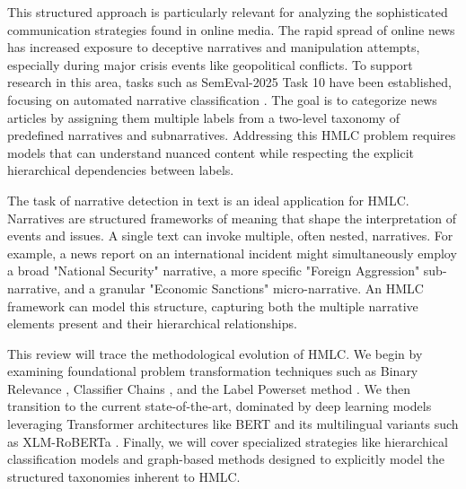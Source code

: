 This structured approach is particularly relevant for analyzing the sophisticated communication strategies found in online media. The rapid spread of online news has increased exposure to deceptive narratives and manipulation attempts, especially during major crisis events like geopolitical conflicts. To support research in this area, tasks such as SemEval-2025 Task 10 have been established, focusing on automated narrative classification \cite{semeval2025task10}. The goal is to categorize news articles by assigning them multiple labels from a two-level taxonomy of predefined narratives and subnarratives. Addressing this HMLC problem requires models that can understand nuanced content while respecting the explicit hierarchical dependencies between labels.

The task of narrative detection in text is an ideal application for HMLC. Narratives are structured frameworks of meaning that shape the interpretation of events and issues. A single text can invoke multiple, often nested, narratives. For example, a news report on an international incident might simultaneously employ a broad "National Security" narrative, a more specific "Foreign Aggression" sub-narrative, and a granular "Economic Sanctions" micro-narrative. An HMLC framework can model this structure, capturing both the multiple narrative elements present and their hierarchical relationships.

This review will trace the methodological evolution of HMLC. We begin by examining foundational problem transformation techniques such as Binary Relevance \cite{zhang_binary_2018}, Classifier Chains \cite{li_relative_2024, weng_label_2020}, and the Label Powerset method \cite{shan_co-learning_2018}. We then transition to the current state-of-the-art, dominated by deep learning models leveraging Transformer architectures like BERT \cite{devlin_bert_2019} and its multilingual variants such as XLM-RoBERTa \cite{conneau_unsupervised_2020}. Finally, we will cover specialized strategies like hierarchical classification models \cite{sadat_hierarchical_2022} and graph-based methods \cite{peng_hierarchical_2021, gong_hierarchical_2020} designed to explicitly model the structured taxonomies inherent to HMLC.